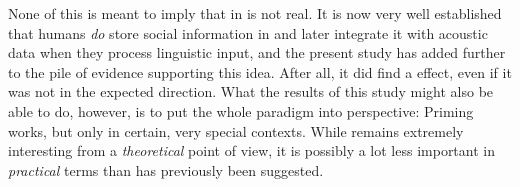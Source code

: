 None of this is meant to imply that  in  is not real.
It is now very well established that humans \emph{do} store social information in  and later integrate it with acoustic data when they process linguistic input, and the present study has added further to the pile of evidence supporting this idea.
After all, it did find a  effect, even if it was not in the expected direction.
What the results of this study might also be able to do, however, is to put the whole  paradigm into perspective: Priming works, but only in certain, very special contexts.
While   remains extremely interesting from a \emph{theoretical} point of view, it is possibly a lot less important in \emph{practical} terms than has previously been suggested.